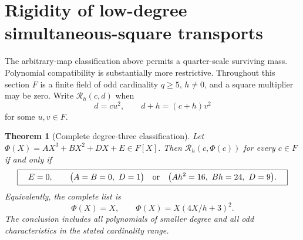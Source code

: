 \documentclass[11pt]{article}
\newtheorem{theorem}{Theorem}[section]
\begin{document}
\section{Rigidity of low-degree simultaneous-square transports}
\label{sec:cubic-square-rigidity}
The arbitrary-map classification above permits a quarter-scale surviving
mass. Polynomial compatibility is substantially more restrictive.
Throughout this section \(F\) is a finite field of odd cardinality
\(q\ge5\), \(h\ne0\), and a square multiplier may be zero.
Write \(\mathcal R_h(c,d)\) when
\[
             d=cu^2,\qquad d+h=(c+h)v^2
\]
for some \(u,v\in F\).

\begin{theorem}[Complete degree-three classification]
\label{thm:cubic-square-rigidity}
Let \(\Phi(X)=AX^3+BX^2+DX+E\in F[X]\).
Then \(\mathcal R_h(c,\Phi(c))\) for every \(c\in F\) if and only if
\[
 \boxed{\quad
 E=0,\qquad
 \bigl(A=B=0,\ D=1\bigr)
 \quad\hbox{or}\quad
 \bigl(Ah^2=16,\ Bh=24,\ D=9\bigr).
 \quad}
\]
Equivalently, the complete list is
\[
                    \Phi(X)=X,\qquad
                    \Phi(X)=X(4X/h+3)^2.
\]
The conclusion includes all polynomials of smaller degree and all
odd characteristics in the stated cardinality range.
\end{theorem}
\end{document}
